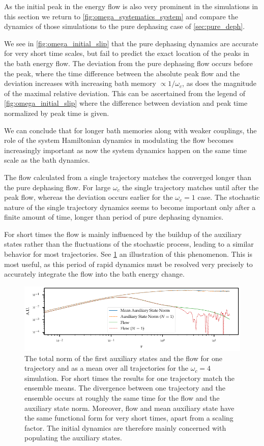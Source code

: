 As the initial peak in the energy flow is also very prominent in the
simulations in this section we return to
\cref{fig:omega_systematics_system} and compare the dynamics of those
simulations to the pure dephasing case of \cref{sec:pure_deph}.

We see in \cref{fig:omega_initial_slip} that the pure dephasing
dynamics are accurate for very short time scales, but fail to predict
the exact location of the peaks in the bath energy flow. The deviation
from the pure dephasing flow occurs before the peak, where the time
difference between the absolute peak flow and the deviation increases
with increasing bath memory \(\propto 1/ω_c\), as does the magnitude
of the maximal relative deviation. This can be ascertained from the
legend of \cref{fig:omega_initial_slip} where the difference between
deviation and peak time normalized by peak time is given.

We can conclude that for longer bath memories along with weaker
couplings, the role of the system Hamiltonian dynamics in modulating
the flow becomes increasingly important as now the system dynamics
happen on the same time scale as the bath dynamics.

The flow calculated from a single trajectory matches the converged
longer than the pure dephasing flow. For large \(ω_{c}\) the single
trajectory matches until after the peak flow, whereas the deviation
occurs earlier for the \(ω_{c}=1\) case. The stochastic nature of the
single trajectory dynamics seems to become important only after a
finite amount of time, longer than period of pure dephasing
dynamics.

For short times the flow is mainly influenced by the buildup of the
auxiliary states rather than the fluctuations of the stochastic
process, leading to a similar behavior for most trajectories. See
\cref{fig:flow_buildup} an illustration of this phenomenon. This is
most useful, as this period of rapid dynamics must be resolved very
precisely to accurately integrate the flow into the bath energy
change.
\begin{figure}[htp]
  \centering
  \includegraphics{figs/one_bath_syst/flow_buildup}
  \caption{\label{fig:flow_buildup} The total norm of the first
    auxiliary states and the flow for one trajectory and as a mean
    over all trajectories for the \(ω_{c}=4\) simulation. For short
    times the results for one trajectory match the ensemble means. The
    divergence between one trajectory and the ensemble occurs at
    roughly the same time for the flow and the auxiliary state
    norm. Moreover, flow and mean auxiliary state have the same
    functional form for very short times, apart from a scaling
    factor. The initial dynamics are therefore mainly concerned with
    populating the auxiliary states.}
\end{figure}

